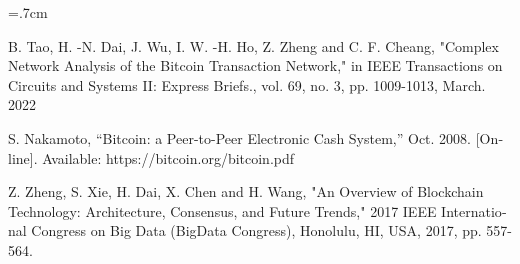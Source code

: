 %

\renewcommand{\bibname}{مراجع}

\begin{thebibliography}{99}

\begin{latin}

\baselineskip=.7cm

\noindent B. Tao, H. -N. Dai, J. Wu, I. W. -H. Ho, Z. Zheng and C. F. Cheang, "Complex Network Analysis of the
Bitcoin Transaction Network," in IEEE Transactions on Circuits and Systems II: Express Briefs., vol. 69,
no. 3, pp. 1009-1013, March. 2022

\noindent S. Nakamoto, “Bitcoin: a Peer-to-Peer Electronic Cash System,” Oct. 2008. [Online]. Available:
https://bitcoin.org/bitcoin.pdf

\noindent Z. Zheng, S. Xie, H. Dai, X. Chen and H. Wang, "An Overview of Blockchain Technology: Architecture,
Consensus, and Future Trends," 2017 IEEE International Congress on Big Data (BigData Congress),
Honolulu, HI, USA, 2017, pp. 557-564.


\end{latin}

\end{thebibliography}